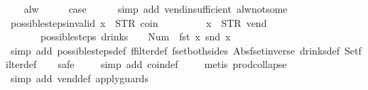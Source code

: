 \begin{isabellebody}
\ \ \isamarkupfalse%
\ alw\isanewline
\ \ \isamarkupfalse%
\ \isamarkupfalse%
\ {\isacharquery}case\isanewline
\ \ \ \ \isamarkupfalse%
\ {\isacharparenleft}simp\ add{\isacharcolon}\ vend{\isacharunderscore}insufficient\ alw{\isacharunderscore}not{\isacharunderscore}some{\isacharparenright}\isanewline
{}\isamarkupfalse%
%
\endisatagproof
{\isafoldproof}%
%
\isadelimproof
\isanewline
%
\endisadelimproof
\isanewline
{}\isamarkupfalse%
\ possible{\isacharunderscore}steps{\isacharunderscore}{}{\isacharunderscore}invalid{\isacharcolon}\ {\isachardoublequoteopen}x{}\ {\isasymnoteq}\ {\isacharparenleft}STR\ {\isacharprime}{\isacharprime}coin{\isacharprime}{\isacharprime}{\isacharcomma}\ {\isacharbrackleft}{\isacharbrackright}{\isacharparenright}\ {\isasymLongrightarrow}\isanewline
\ \ \ \ \ \ \ x{}\ {\isasymnoteq}\ {\isacharparenleft}STR\ {\isacharprime}{\isacharprime}vend{\isacharprime}{\isacharprime}{\isacharcomma}\ {\isacharbrackleft}{\isacharbrackright}{\isacharparenright}\ {\isasymLongrightarrow}\isanewline
\ \ \ \ \ \ \ possible{\isacharunderscore}steps\ drinks\ {}\ {\isacharless}{}\ {\isacharcolon}{\isacharequal}\ Num\ {}{\isachargreater}\ {\isacharparenleft}fst\ x{}{\isacharparenright}\ {\isacharparenleft}snd\ x{}{\isacharparenright}\ {\isacharequal}\ {\isacharbraceleft}{\isacharbar}{\isacharbar}{\isacharbraceright}{\isachardoublequoteclose}\isanewline
%
\isadelimproof
\ \ %
\endisadelimproof
%
\isatagproof
{}\isamarkupfalse%
\ {\isacharparenleft}simp\ add{\isacharcolon}\ possible{\isacharunderscore}steps{\isacharunderscore}def\ ffilter{\isacharunderscore}def\ fset{\isacharunderscore}both{\isacharunderscore}sides\ Abs{\isacharunderscore}fset{\isacharunderscore}inverse\ drinks{\isacharunderscore}def\ Set{\isachardot}filter{\isacharunderscore}def{\isacharparenright}\isanewline
\ \ \isamarkupfalse%
\ safe\isanewline
\ \ \ \isamarkupfalse%
\ {\isacharparenleft}simp\ add{\isacharcolon}\ coin{\isacharunderscore}def{\isacharparenright}\isanewline
\ \ \ \isamarkupfalse%
\ {\isacharparenleft}metis\ prod{\isachardot}collapse{\isacharparenright}\isanewline
\ \ \isamarkupfalse%
\ {\isacharparenleft}simp\ add{\isacharcolon}\ vend{\isacharunderscore}def\ apply{\isacharunderscore}guards{\isacharparenright}%
\endisatagproof
{\isafoldproof}%
%
\isadelimproof
\isanewline
%
\endisadelimproof
\isanewline

\end{isabellebody}
